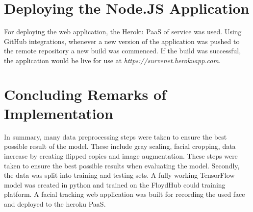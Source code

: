 \newpage



\section{Deploying the Node.JS Application}

For deploying the web application, the Heroku PaaS of service was used. Using GitHub integrations, whenever a new version of the application was pushed to the remote repository a new build was commenced. If the build was successful, the application would be live for use at \textit{https://survenet.herokuapp.com}.

\section{Concluding Remarks of Implementation}

In summary, many data preprocessing steps were taken to ensure the best possible result of the model. These include gray scaling, facial cropping, data increase by creating flipped copies and image augmentation. These steps were taken to ensure the best possible results when evaluating the model. Secondly, the data was split into training and testing sets. A fully working TensorFlow model was created in python and trained on the FloydHub could training platform. A facial tracking web application was built for recording the used face and deployed to the heroku PaaS. 



